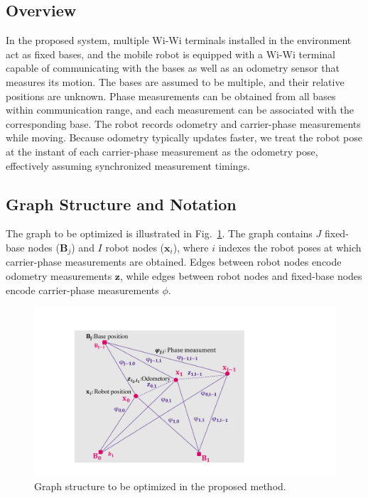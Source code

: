 \documentclass[conference]{IEEEtran}
\begin{document}
\subsection{Overview}
In the proposed system, multiple Wi-Wi terminals installed in the environment act as fixed bases, and the mobile robot is equipped with a Wi-Wi terminal capable of communicating with the bases as well as an odometry sensor that measures its motion.
The bases are assumed to be multiple, and their relative positions are unknown.
Phase measurements can be obtained from all bases within communication range, and each measurement can be associated with the corresponding base.
The robot records odometry and carrier-phase measurements while moving.
Because odometry typically updates faster, we treat the robot pose at the instant of each carrier-phase measurement as the odometry pose, effectively assuming synchronized measurement timings.

\subsection{Graph Structure and Notation}
The graph to be optimized is illustrated in Fig.~\ref{fig:graph_structure}.
The graph contains $J$ fixed-base nodes ($\mathbf{B}_j$) and $I$ robot nodes ($\mathbf{x}_i$), where $i$ indexes the robot poses at which carrier-phase measurements are obtained.
Edges between robot nodes encode odometry measurements $\mathbf{z}$, while edges between robot nodes and fixed-base nodes encode carrier-phase measurements $\phi$.

\begin{figure}[tb]
    \centering
    \includegraphics[width=0.95\linewidth]{figures/graph.pdf}
    \caption{Graph structure to be optimized in the proposed method.}
    \label{fig:graph_structure}
\end{figure}
\end{document}
